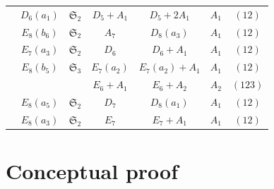 \documentclass{amsart}
\theoremstyle{definition}
\newcommand{\cP}{\mathcal{P}}
\newcommand{\frakS}{\mathfrak{S}}
\newcommand{\0}{\mathcal{O}}
\begin{document}
\begin{table}
\begin{center}
\begin{tabular}{|c | c| c|c |c| c| c|}
				& $D_6(a_1)$ & $\frakS_2$ & $D_5+A_1$ & $D_5+2A_1$ &  $A_1$ & $(12)$\\  	 
                & $E_8(b_6)$ & $\frakS_2$ & $A_7$ & $D_8(a_3)$ &  $A_1$ & $(12)$\\  	
            & $E_7(a_3)$ & $\frakS_2$ & $D_6$ & $D_6+A_1$ &  $A_1$ & $(12)$\\ 
                & $E_8(b_5)$ & $\frakS_3$ & $E_7(a_2)$ & $E_7(a_2)+A_1$ &  $A_1$ & $(12)$\\  	
	          & & & $E_6+A_1$ & $E_6+A_2$ &  $A_2$ & $(123)$\\ 

                & $E_8(a_5)$ & $\frakS_2$ & $D_7$ & $D_8(a_1)$ &  $A_1$ & $(12)$\\  
                
                & $E_8(a_3)$ & $\frakS_2$ & $E_7$ & $E_7+A_1$  &  $A_1$ & $(12)$\\  
                \hline 
			\end{tabular}
		\end{center}
	\end{table}




\section{Conceptual proof}\label{conceptualsec}

\end{document}
